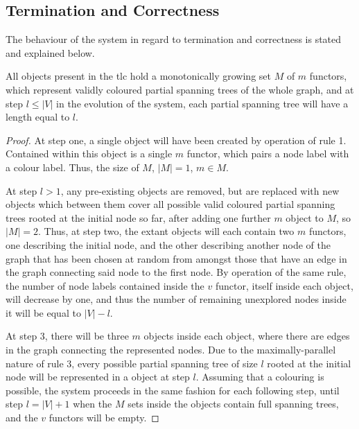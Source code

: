 \subsection{Termination and Correctness}
The behaviour of the system in regard to termination and correctness is stated and explained below.

\begin{proposition}\label{prop:gcol:grow}
All \bo{} objects present in the \gls{tlc} hold a monotonically growing set \(M\) of \(m\) functors, which represent validly coloured partial spanning trees of the whole graph, and at step \(l \leq |V|\) in the evolution of the system, each partial spanning tree will have a length equal to \(l\).
\end{proposition}

\begin{proof}
At step one, a single \bo{} object will have been created by operation of rule 1.  Contained within this \bo{} object is a single \(m\) functor, which pairs a node label with a colour label.  Thus, the size of \(M\), \(|M|=1\), \(m \in M\).

At step \(l > 1\), any pre-existing \bo{} objects are removed, but are replaced with new \bo{} objects which between them cover all possible valid coloured partial spanning trees rooted at the initial node so far, after adding one further \(m\) object to \(M\), so \(|M|=2\).  Thus, at step two, the extant \bo{} objects will each contain two \(m\) functors, one describing the initial node, and the other describing another node of the graph that has been chosen at random from amongst those that have an edge in the graph connecting said node to the first node.  By operation of the same rule, the number of node labels contained inside the \(v\) functor, itself inside each \bo{} object, will decrease by one, and thus the number of remaining unexplored nodes inside it will be equal to \(|V| - l\).

At step 3, there will be three \(m\) objects inside each \bo{} object, where there are edges in the graph connecting the represented nodes.  Due to the maximally-parallel nature of rule 3, every possible partial spanning tree of size \(l\) rooted at the initial node will be represented in a \bo{} object at step \(l\).  Assuming that a colouring is possible, the system proceeds in the same fashion for each following step, until step \(l = |V| + 1\) when the \(M\) sets inside the \bo{} objects contain full spanning trees, and the \(v\) functors will be empty.


\end{proof}
